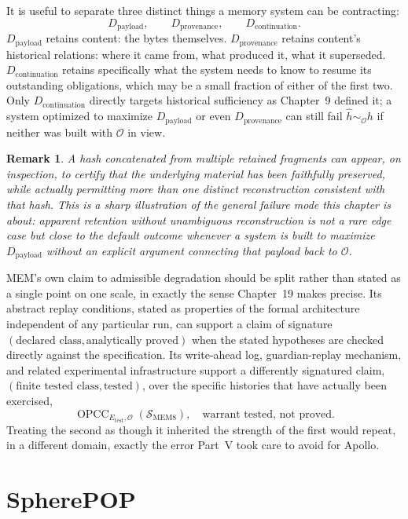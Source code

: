 \documentclass[11pt]{report}
\newtheorem{remark}[definition]{Remark}
\begin{document}
It is useful to separate three distinct things a memory system can be contracting:
\[
D_{\mathrm{payload}}, \qquad D_{\mathrm{provenance}}, \qquad D_{\mathrm{continuation}}.
\]
$D_{\mathrm{payload}}$ retains content: the bytes themselves. $D_{\mathrm{provenance}}$ retains content's historical relations: where it came from, what produced it, what it superseded. $D_{\mathrm{continuation}}$ retains specifically what the system needs to know to resume its outstanding obligations, which may be a small fraction of either of the first two. Only $D_{\mathrm{continuation}}$ directly targets historical sufficiency as Chapter~9 defined it; a system optimized to maximize $D_{\mathrm{payload}}$ or even $D_{\mathrm{provenance}}$ can still fail $\widehat h \sim_{\mathcal O} h$ if neither was built with $\mathcal O$ in view.

\begin{remark}
A hash concatenated from multiple retained fragments can appear, on inspection, to certify that the underlying material has been faithfully preserved, while actually permitting more than one distinct reconstruction consistent with that hash. This is a sharp illustration of the general failure mode this chapter is about: apparent retention without unambiguous reconstruction is not a rare edge case but close to the default outcome whenever a system is built to maximize $D_{\mathrm{payload}}$ without an explicit argument connecting that payload back to $\mathcal O$.
\end{remark}

MEM's own claim to admissible degradation should be split rather than stated as a single point on one scale, in exactly the sense Chapter~19 makes precise. Its abstract replay conditions, stated as properties of the formal architecture independent of any particular run, can support a claim of signature $(\text{declared class}, \text{analytically proved})$ when the stated hypotheses are checked directly against the specification. Its write-ahead log, guardian-replay mechanism, and related experimental infrastructure support a differently signatured claim, $(\text{finite tested class}, \text{tested})$, over the specific histories that have actually been exercised,
\[
\operatorname{OPCC}_{E_{\mathrm{test}}, \mathcal O}(\mathcal S_{\mathrm{MEM8}}), \quad \text{warrant tested, not proved.}
\]
Treating the second as though it inherited the strength of the first would repeat, in a different domain, exactly the error Part~V took care to avoid for Apollo.

\chapter{SpherePOP}
\end{document}
